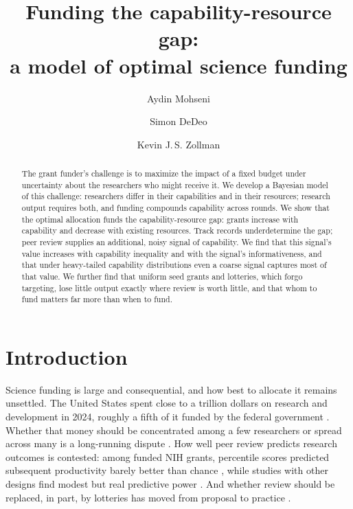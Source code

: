 \documentclass[article, 11pt, reqno]{amsart}
\title[Funding the capability-resource gap]{Funding the capability-resource gap:\\ a model of optimal science funding}
\author{Aydin Mohseni}
\author{Simon DeDeo}
\author{Kevin J.\,S. Zollman}
\theoremstyle{named}
\begin{document}
\begin{abstract}
The grant funder's challenge is to maximize the impact of a fixed budget under uncertainty about the researchers who might receive it. We develop a Bayesian model of this challenge: researchers differ in their capabilities and in their resources; research output requires both, and funding compounds capability across rounds. We show that the optimal allocation funds the capability-resource gap: grants increase with capability and decrease with existing resources. Track records underdetermine the gap; peer review supplies an additional, noisy signal of capability. We find that this signal's value increases with capability inequality and with the signal's informativeness, and that under heavy-tailed capability distributions even a coarse signal captures most of that value. We further find that uniform seed grants and lotteries, which forgo targeting, lose little output exactly where review is worth little, and that whom to fund matters far more than when to fund.
\end{abstract}

\maketitle

\section{Introduction}\label{sec:intro}

Science funding is large and consequential, and how best to allocate it remains unsettled. The United States spent close to a trillion dollars on research and development in 2024, roughly a fifth of it funded by the federal government \citep{NCSES2026, NSB2026}. Whether that money should be concentrated among a few researchers or spread across many is a long-running dispute \citep{Aagaard2020}. How well peer review predicts research outcomes is contested: among funded NIH grants, percentile scores predicted subsequent productivity barely better than chance \citep{Fang2016}, while studies with other designs find modest but real predictive power \citep{Gallo2014, LiAgha2015, ParkLeeKim2015}. %
And whether review should be replaced, in part, by lotteries has moved from proposal to practice \citep{Roumbanis2019, Heyard2022}. %
\end{document}
